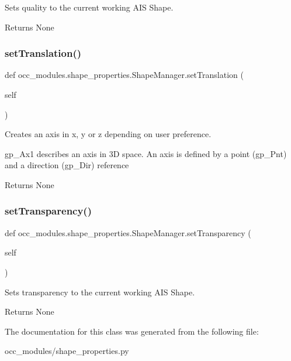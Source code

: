 Sets quality to the current working A\+IS Shape. 

\begin{DoxyReturn}{Returns}
None 
\end{DoxyReturn}
\hypertarget{a00101_a1cab1ea26a1cd0091d88106b6b4715bb}{}\label{a00101_a1cab1ea26a1cd0091d88106b6b4715bb} 
\subsubsection{\texorpdfstring{set\+Translation()}{setTranslation()}}
{\footnotesize\ttfamily def occ\+\_\+modules.\+shape\+\_\+properties.\+Shape\+Manager.\+set\+Translation (\begin{DoxyParamCaption}\item[{}]{self }\end{DoxyParamCaption})}



Creates an axis in x, y or z depending on user preference. 

gp\+\_\+\+Ax1 describes an axis in 3D space. An axis is defined by a point (gp\+\_\+\+Pnt) and a direction (gp\+\_\+\+Dir) reference

\begin{DoxyReturn}{Returns}
None 
\end{DoxyReturn}
\hypertarget{a00101_a8d7fdd0bde28afe34d3793c8bcf060fa}{}\label{a00101_a8d7fdd0bde28afe34d3793c8bcf060fa} 
\subsubsection{\texorpdfstring{set\+Transparency()}{setTransparency()}}
{\footnotesize\ttfamily def occ\+\_\+modules.\+shape\+\_\+properties.\+Shape\+Manager.\+set\+Transparency (\begin{DoxyParamCaption}\item[{}]{self }\end{DoxyParamCaption})}



Sets transparency to the current working A\+IS Shape. 

\begin{DoxyReturn}{Returns}
None 
\end{DoxyReturn}


The documentation for this class was generated from the following file\+:\begin{DoxyCompactItemize}
\item 
occ\+\_\+modules/shape\+\_\+properties.\+py\end{DoxyCompactItemize}
